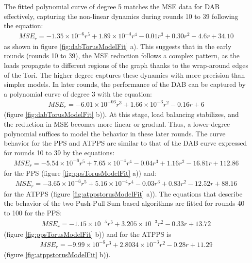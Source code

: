 The fitted polynomial curve of degree 5 matches the MSE data for DAB effectively, capturing the non-linear dynamics during rounds 10 to 39 following the equation: 
\begin{align}
    MSE_r=-1.35\times 10^{-6}r^{5}+ 1.89\times 10^{-4}r^{4}-0.01r^{3}+0.30r^{2}-4.6r+34.10    
\end{align}
as shown in figure \ref{fig:dabTorusModelFit} a). This suggests that in the early rounds (rounds 10 to 39), the MSE reduction follows a complex pattern, as the loads propagate to different regions of the graph thanks to the wrap-around edges of the Tori. The higher degree captures these dynamics with more precision than simpler models. In later rounds, the performance of the DAB can be captured by a polynomial curve of degree 3 with the equation:
\begin{align}
    MSE_r=-6.01\times 10^{-06}r^{3}+1.66\times 10^{-3}r^{2}-0.16r+6    
\end{align}
(figure \ref{fig:dabTorusModelFit} b)). At this stage, load balancing stabilizes, and the reduction in MSE becomes more linear or gradual. Thus, a lower-degree polynomial suffices to model the behavior in these later rounds. The curve behavior for the PPS and ATPPS are similar to that of the DAB curve expressed for rounds 10 to 39 by the equations:
\begin{align}
    MSE_r=-5.54\times 10^{-6}r^{5}+7.65\times 10^{-4}r^{4}-0.04r^{3}+1.16r^{2}-16.81r+112.86    
\end{align}
for the PPS (figure \ref{fig:ppsTorusModelFit} a)) and:
\begin{align}
    MSE_r = -3.65 \times 10^{-6}r^{5} + 5.16 \times 10^{-4}r^{4} - 0.03r^{3} + 0.83r^{2} - 12.52r + 88.16    
\end{align}
for the ATPPS (figure \ref{fig:atppstorusModelFit} a)). The equations that describe the behavior of the two Push-Pull Sum based algorithms are fitted for rounds 40 to 100 for the PPS: 
\begin{align}
    MSE_r = -1.15 \times 10^{-5}r^{3} + 3.205\times 10^{-3}r^{2} - 0.33r + 13.72    
\end{align}
(figure \ref{fig:ppsTorusModelFit} b)) and for the ATPPS is
\begin{align}
    MSE_r = -9.99 \times 10^{-6}r^{3} + 2.8034\times 10^{-3}r^{2} - 0.28r + 11.29    
\end{align}
(figure \ref{fig:atppstorusModelFit} b)).


